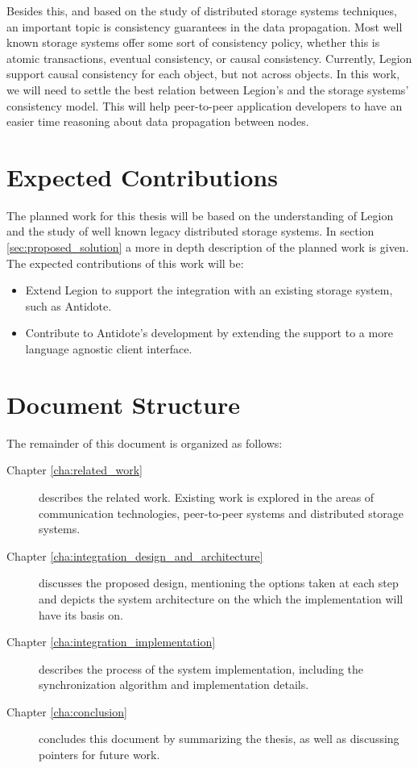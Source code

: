	Besides this, and based on the study of distributed storage systems techniques, an important topic is consistency guarantees in the data propagation. Most well known storage systems offer some sort of consistency policy, whether this is atomic transactions, eventual consistency, or causal consistency. Currently, Legion support causal consistency for each object, but not across objects. In this work, we will need to settle the best relation between Legion's and the storage systems' consistency model. This will help peer-to-peer application developers to have an easier time reasoning about data propagation between nodes.

\section{Expected Contributions}
\label{sec:expected_contributions}
The planned work for this thesis will be based on the understanding of Legion and the study of well known legacy distributed storage systems. In section \ref{sec:proposed_solution} a more in depth description of the planned work is given. The expected contributions of this work will be:
	
\begin{itemize}
\item Extend Legion to support the integration with an existing storage system, such as Antidote.

\item Contribute to Antidote's development by extending the support to a more language agnostic client interface.

\end{itemize}

\section{Document Structure}
\label{document_structure}
The remainder of this document is organized as follows:\par

\begin{description}
\item[Chapter \ref{cha:related_work}] describes the related work. Existing work is explored in the areas of communication technologies, peer-to-peer systems and distributed storage systems.

\item[Chapter \ref{cha:integration_design_and_architecture}] discusses the proposed design, mentioning the options taken at each step and depicts the system architecture on the which the implementation will have its basis on.

\item[Chapter \ref{cha:integration_implementation}] describes the process of the system implementation, including the synchronization algorithm and implementation details.

\item[Chapter \ref{cha:conclusion}] concludes this document by summarizing the thesis, as well as discussing pointers for future work.
\end{description}